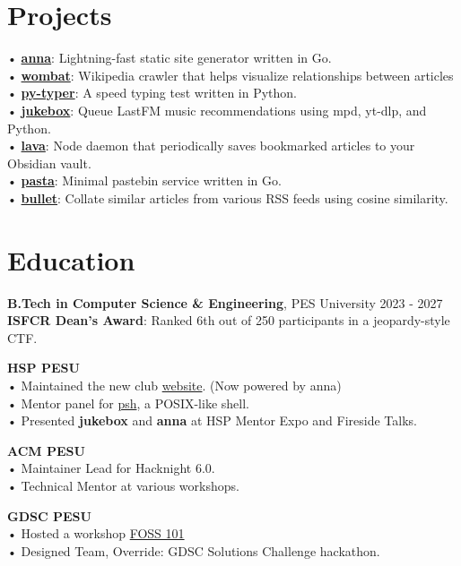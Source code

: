 \documentclass[a4,12pt]{article}
\begin{document}
\section{Projects}
• \textbf{\href{https://github.com/anna-ssg/anna}{anna}}: Lightning-fast static site generator written in Go. \\
• \textbf{\href{https://github.com/polarhive/wombat}{wombat}}: Wikipedia crawler that helps visualize relationships between articles \\
• \textbf{\href{https://github.com/polarhive/py-typer}{py-typer}}: A speed typing test written in Python. \\
• \textbf{\href{https://github.com/polarhive/jukebox}{jukebox}}: Queue LastFM music recommendations using mpd, yt-dlp, and Python. \\
• \textbf{\href{https://polarhive.net/lava}{lava}}: Node daemon that periodically saves bookmarked articles to your Obsidian vault. \\
• \textbf{\href{https://polarhive.net/pasta}{pasta}}: Minimal pastebin service written in Go. \\
• \textbf{\href{https://polarhive.net/bullet}{bullet}}: Collate similar articles from various RSS feeds using cosine similarity.

\section{Education}
\textbf{B.Tech in Computer Science \& Engineering}, PES University \hfill 2023 - 2027 \\
\textbf{ISFCR Dean's Award}: Ranked 6th out of 250 participants in a jeopardy-style CTF.

\textbf{HSP PESU} \\
• Maintained the new club \href{https://tiramisu-hsp.netlify.app}{website}. (Now powered by anna) \\
• Mentor panel for \href{https://github.com/psh-shell}{psh}, a POSIX-like shell. \\
• Presented \textbf{jukebox} and \textbf{anna} at HSP Mentor Expo and Fireside Talks.

\textbf{ACM PESU} \\
• Maintainer Lead for Hacknight 6.0. \\
• Technical Mentor at various workshops.

\textbf{GDSC PESU} \\
• Hosted a workshop \href{https://polarhive.net/talks/gdsc-foss-101/}{FOSS 101} \\
• Designed Team, Override: GDSC Solutions Challenge hackathon.
\end{document}
